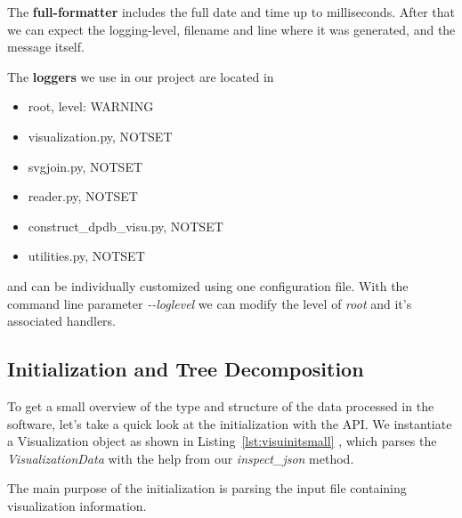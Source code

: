 \documentclass[a4paper, 12pt, bibliography=totoc]{scrartcl}
\begin{document}
The \textbf{full-formatter} includes the full date and time up to milliseconds. After that we can expect the logging-level, filename and line where it was generated, and the message itself.

The \textbf{loggers} we use in our project are located in 
\begin{itemize}
	\item root, level: WARNING
	\item visualization.py, NOTSET
	\item svgjoin.py, NOTSET
    \item reader.py, NOTSET
	\item construct\_dpdb\_visu.py, NOTSET
	\item utilities.py, NOTSET
\end{itemize}
and can be individually customized using one configuration file.
With the command line parameter \textit{-{}-loglevel} we can modify the level of \textit{root} and it's associated handlers.

\subsection{Initialization and Tree Decomposition}

To get a small overview of the type and structure of the data processed in the software, let's take a quick look at the initialization with the API. We instantiate a Visualization object as shown in Listing~\ref{lst:visuinitsmall} , which parses the \textit{VisualizationData} with the help from our \textit{inspect\_json} method. 

The main purpose of the initialization is parsing the input file containing visualization information.
\end{document}
